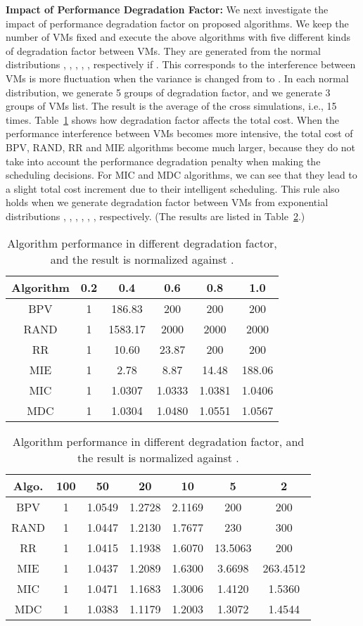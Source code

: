 \documentclass[10pt,journal]{IEEEtran}
\begin{document}
\textbf{Impact of Performance Degradation Factor:} We next investigate the impact of performance degradation factor on proposed algorithms. We keep the number of VMs fixed and execute the above algorithms with five different kinds of degradation factor between VMs. They are generated from the normal distributions , , , , , respectively  if . This corresponds to the interference between VMs is more fluctuation when the variance is changed from  to . In each normal distribution, we generate 5 groups of degradation factor, and we generate 3 groups of VMs list. The result is the average of the cross simulations, i.e., 15 times. Table~\ref{tb:eva_perf_degFactorN} shows how degradation factor affects the total cost. When the performance interference between VMs becomes more intensive, the total cost of BPV, RAND, RR and MIE algorithms become much larger, because they do not take into account the performance degradation penalty when making the scheduling decisions. For MIC and MDC algorithms, we can see that they lead to a slight total cost increment due to their intelligent scheduling. This rule also holds when we generate degradation factor between VMs from exponential distributions , , , , , , respectively. (The results are listed in Table~\ref{tb:eva_perf_degFactorE}.)
\begin{table}[htbp]
\centering
\caption{\label{tb:eva_perf_degFactorN}Algorithm performance in different  degradation factor, and the result is normalized against .}
\begin{tabular}{c|c|c|c|c|c}\hline\hline
Algorithm&0.2&0.4&0.6&0.8&1.0\\\hline
BPV&1&186.83&200&200&200\\
RAND&1&1583.17&2000&2000&2000\\
RR&1&10.60&23.87&200&200\\
MIE&1&2.78&8.87&14.48&188.06\\\hline
MIC&1&1.0307&1.0333&1.0381&1.0406\\
MDC&1&1.0304&1.0480&1.0551&1.0567\\\hline\hline
\end{tabular}
\end{table}
\begin{table}[htbp]
\centering
\caption{\label{tb:eva_perf_degFactorE}Algorithm performance in different  degradation factor, and the result is normalized against .}
\begin{tabular}{c|c|c|c|c|c|c}\hline\hline
Algo.&100&50&20&10&5&2\\\hline
BPV&1&1.0549&1.2728&2.1169&200&200\\
RAND&1&1.0447&1.2130&1.7677&230&300\\
RR&1&1.0415&1.1938&1.6070&13.5063&200\\
MIE&1&1.0437&1.2089&1.6300&3.6698&263.4512\\\hline
MIC&1&1.0471&1.1683&1.3006&1.4120&1.5360\\
MDC&1&1.0383&1.1179&1.2003&1.3072&1.4544\\\hline\hline
\end{tabular}
\end{table}
\end{document}
